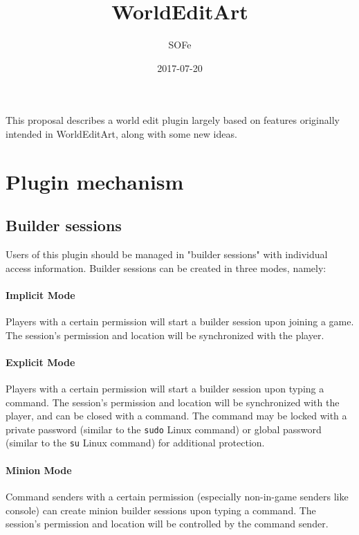\documentclass{article}
\title{WorldEditArt}
\date{2017-07-20}
\author{SOFe}
\begin{document}
	\maketitle
	This proposal describes a world edit plugin largely based on features originally intended in WorldEditArt, along with
	some new ideas.
	\section{Plugin mechanism}
		\subsection{Builder sessions}
			Users of this plugin should be managed in "builder sessions" with individual access information. Builder
			sessions can be created in three modes, namely:
			\paragraph{Implicit Mode}
				Players with a certain permission will start a builder session upon joining a game. The session's permission
				and location will be synchronized with the player.
			\paragraph{Explicit Mode}
				Players with a certain permission will start a builder session upon typing a command. The session's
				permission and location will be synchronized with the player, and can be closed with a command. The command
				may be locked with a private password (similar to the \texttt{sudo} Linux command) or global password
				(similar to the \texttt{su} Linux command) for additional protection.
			\paragraph{Minion Mode}
				Command senders with a certain permission (especially non-in-game senders like console) can create minion
				builder sessions upon typing a command. The session's permission and location will be controlled by the
				command sender.
\end{document}
